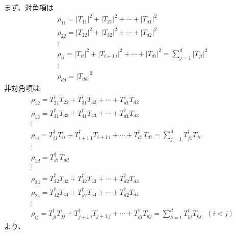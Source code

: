 \documentclass[11pt,a4j,notitlepage]{jreport}
\begin{document}
	まず、対角項は
	\begin{equation*}
		\begin{gathered}
			\rho_{11} = \big| T_{11} \big|^2 + \big| T_{21} \big|^2 + \cdots + \big| T_{d1} \big|^2 \\
			\rho_{22} = \big| T_{22} \big|^2 + \big| T_{32} \big|^2 + \cdots + \big| T_{d2} \big|^2 \\
			\vdots \\
			\rho_{ii} = \big| T_{ii} \big|^2 + \big| T_{i+1\ i} \big|^2 + \cdots + \big| T_{di} \big|^2 = \sum_{j=1}^d \big| T_{ji} \big|^2 \\
			\vdots \\
			\rho_{dd} = \big| T_{dd} \big|^2
		\end{gathered}
	\end{equation*}
	非対角項は
	\begin{equation*}
		\begin{gathered}
			\rho_{12} = T_{21}^\dagger T_{22} + T_{31}^\dagger T_{32} + \cdots + T_{d1}^\dagger T_{d2} \\
			\rho_{13} = T_{31}^\dagger T_{33} + T_{41}^\dagger T_{43} + \cdots + T_{d1}^\dagger T_{d3} \\
			\vdots \\
			\rho_{1i} = T_{i1}^\dagger T_{ii} + T_{i+1\ 1}^\dagger T_{i+1\ i} + \cdots + T_{d1}^\dagger T_{di} = \sum_{j=1}^d T_{j1}^\dagger T_{ji}\\
			\vdots \\
			\rho_{1d} = T_{d1}^\dagger T_{dd} \\
			\vdots \\
			\rho_{23} = T_{32}^\dagger T_{33} + T_{42}^\dagger T_{43} + \cdots + T_{d2}^\dagger T_{d3} \\
			\rho_{24} = T_{42}^\dagger T_{44} + T_{52}^\dagger T_{54} + \cdots + T_{d2}^\dagger T_{d4} \\
			\vdots \\
			\rho_{ij} = T_{ji}^\dagger T_{jj} + T_{j+1\ i}^\dagger T_{j+1\ j} + \cdots + T_{di}^\dagger T_{dj} = \sum_{k=1}^d T_{ki}^\dagger T_{kj}\ \ \ (i<j)
		\end{gathered}
	\end{equation*}
	より、
\end{document}
